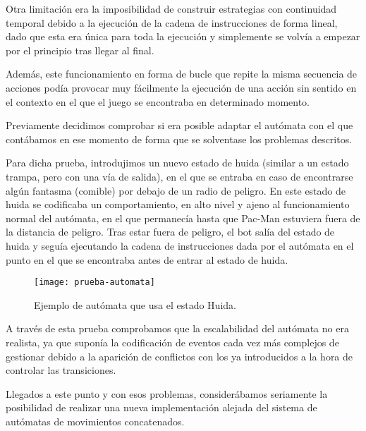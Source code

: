 Otra limitación era la imposibilidad de construir estrategias con continuidad temporal debido a la ejecución de la cadena de instrucciones de forma lineal, dado que esta era única para toda la ejecución y simplemente se volvía a empezar por el principio tras llegar al final.
 
Además, este funcionamiento en forma de bucle que repite la misma secuencia de acciones podía provocar muy fácilmente la ejecución de una acción sin sentido en el contexto en el que el juego se encontraba en determinado momento.
 
Previamente decidimos comprobar si era posible adaptar el autómata con el que contábamos en ese momento de forma que se solventase los problemas descritos.
 
Para dicha prueba, introdujimos un nuevo estado de huida (similar a un estado trampa, pero con una vía de salida), en el que se entraba en caso de encontrarse algún fantasma (comible) por debajo de un radio de peligro. 
En este estado de huida se codificaba un comportamiento, en alto nivel y ajeno al funcionamiento normal del autómata, en el que permanecía hasta que Pac-Man estuviera fuera de la distancia de peligro. Tras estar fuera de peligro, el bot salía del estado de huida y seguía ejecutando la cadena de instrucciones dada por el autómata en el punto en el que se encontraba antes de entrar al estado de huida.
\begin{figure}[H]
\centering
\texttt{[image: prueba-automata]}
\caption{Ejemplo de autómata que usa el estado Huida.}
\end{figure}

A través de esta prueba comprobamos que la escalabilidad del autómata no era realista, ya que suponía la codificación de eventos cada vez más complejos de gestionar debido a la aparición de conflictos con los ya introducidos a la hora de controlar las transiciones.
 
Llegados a este punto y con esos problemas, considerábamos seriamente la posibilidad de realizar una nueva implementación alejada del sistema de autómatas de movimientos concatenados.
